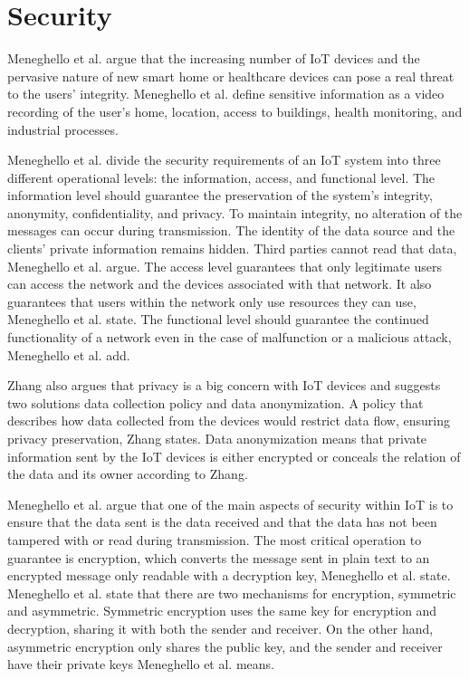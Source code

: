\section{Security}
Meneghello et al. argue that the increasing number of IoT devices and the pervasive nature of new smart home or healthcare devices can pose a real threat to the users' integrity.
Meneghello et al. define sensitive information as a video recording of the user's home, location, access to buildings, health monitoring, and industrial processes.\cite{Meneghello2019}

Meneghello et al. divide the security requirements of an IoT system into three different operational levels: the information, access, and functional level.
The information level should guarantee the preservation of the system's integrity, anonymity, confidentiality, and privacy.
To maintain integrity, no alteration of the messages can occur during transmission. The identity of the data source and the clients' private information remains hidden. Third parties cannot read that data, Meneghello et al. argue.
The access level guarantees that only legitimate users can access the network and the devices associated with that network. 
It also guarantees that users within the network only use resources they can use, Meneghello et al. state.
The functional level should guarantee the continued functionality of a network even in the case of malfunction or a malicious attack, Meneghello et al. add.\cite{Meneghello2019}

Zhang also argues that privacy is a big concern with IoT devices and suggests two solutions data collection policy and data anonymization.
A policy that describes how data collected from the devices would restrict data flow, ensuring privacy preservation, Zhang states.
Data anonymization means that private information sent by the IoT devices is either encrypted or conceals the relation of the data and its owner according to Zhang.\cite{Zhang2014}

Meneghello et al. argue that one of the main aspects of security within IoT is to ensure that the data sent is the data received and that the data has not been tampered with or read during transmission.
The most critical operation to guarantee is encryption, which converts the message sent in plain text to an encrypted message only readable with a decryption key, Meneghello et al. state.
Meneghello et al. state that there are two mechanisms for encryption, symmetric and asymmetric.
Symmetric encryption uses the same key for encryption and decryption, sharing it with both the sender and receiver.
On the other hand, asymmetric encryption only shares the public key, and the sender and receiver have their private keys Meneghello et al. means.\cite{Meneghello2019}

